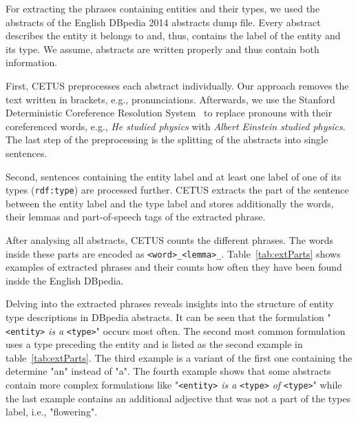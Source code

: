 For extracting the phrases containing entities and their types, we used the abstracts of the English DBpedia 2014 abstracts dump file.
Every abstract describes the entity it belongs to and, thus, contains the label of the entity and its type.
We assume, abstracts are written properly and thus contain both information.

First, CETUS preprocesses each abstract individually.
Our approach removes the text written in brackets, e.g., pronunciations.
Afterwards, we use the Stanford Deterministic Coreference Resolution System~\cite{Lee2013} to replace pronouns with their coreferenced words, e.g., \emph{He studied physics} with \emph{Albert Einstein studied physics}.
The last step of the preprocessing is the splitting of the abstracts into single sentences.

Second, sentences containing the entity label and at least one label of one of its types (\texttt{rdf:type}) are processed further.
CETUS extracts the part of the sentence between the entity label and the type label and stores additionally the words, their lemmas and part-of-speech tags of the extracted phrase.

After analysing all abstracts, CETUS counts the different phrases.
The words inside these parts are encoded as \texttt{<word>\_<lemma>\_<pos-tag>}.
Table~\ref{tab:extParts} shows examples of extracted phrases and their counts how often they have been found inside the English DBpedia.

Delving into the extracted phrases reveals insights into the structure of entity type descriptions in DBpedia abstracts.
It can be seen that the formulation "\texttt{<entity>} \emph{is a} \texttt{<type>}" occurs most often.
The second most common formulation uses a type preceding the entity and is listed as the second example in table~\ref{tab:extParts}.
The third example is a variant of the first one containing the determine "an" instead of "a".
The fourth example shows that some abstracts contain more complex formulations like "\texttt{<entity>} \emph{is a} \texttt{<type>} \emph{of} \texttt{<type>}" while the last example contains an additional adjective that was not a part of the types label, i.e., "flowering".


